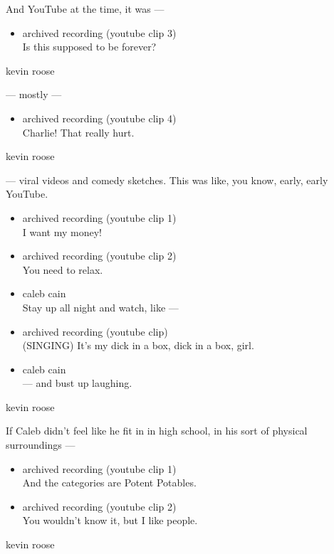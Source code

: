 And YouTube at the time, it was ---

\begin{itemize}
\tightlist
\item
  archived recording (youtube clip 3)\\
  Is this supposed to be forever?
\end{itemize}

kevin roose

--- mostly ---

\begin{itemize}
\tightlist
\item
  archived recording (youtube clip 4)\\
  Charlie! That really hurt.
\end{itemize}

kevin roose

--- viral videos and comedy sketches. This was like, you know, early,
early YouTube.

\begin{itemize}
\item
  archived recording (youtube clip 1)\\
  I want my money!
\item
  archived recording (youtube clip 2)\\
  You need to relax.
\item
  caleb cain\\
  Stay up all night and watch, like ---
\item
  archived recording (youtube clip)\\
  (SINGING) It's my dick in a box, dick in a box, girl.
\item
  caleb cain\\
  --- and bust up laughing.
\end{itemize}

kevin roose

If Caleb didn't feel like he fit in in high school, in his sort of
physical surroundings ---

\begin{itemize}
\item
  archived recording (youtube clip 1)\\
  And the categories are Potent Potables.
\item
  archived recording (youtube clip 2)\\
  You wouldn't know it, but I like people.
\end{itemize}

kevin roose

